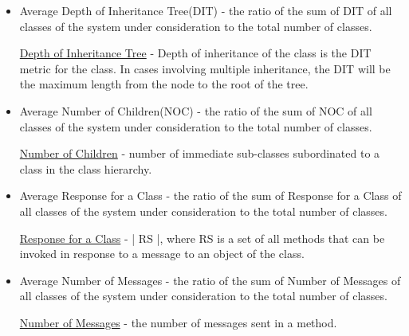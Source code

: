 \documentclass{article}
\begin{document}
\begin{itemize}
\item Average Depth of Inheritance Tree(DIT) - the ratio of the sum of DIT of all classes of the system under consideration to the total number of classes.

\href{https://www.eso.org/~tcsmgr/oowg-forum/TechMeetings/Articles/OOMetrics.pdf}{Depth of Inheritance Tree} - Depth of inheritance of the class is the DIT metric for the class. In cases involving multiple inheritance, the
DIT will be the maximum length from the node to the root of the tree.

\item
Average Number of Children(NOC) - the ratio of the sum of NOC of all classes of the system under consideration to the total number of classes.

\href{https://www.eso.org/~tcsmgr/oowg-forum/TechMeetings/Articles/OOMetrics.pdf}{Number of Children} - number of immediate sub-classes subordinated to a class in the class hierarchy.

\item
Average Response for a Class - the ratio of the sum of Response for a Class of all classes of the system under consideration to the total number of classes.

\href{https://www.eso.org/~tcsmgr/oowg-forum/TechMeetings/Articles/OOMetrics.pdf}{Response for a Class} - \big | RS \big |, where RS is a set of all methods that can be invoked in response to a message to an object of
the class.

\item
Average Number of Messages - the ratio of the sum of Number of Messages of all classes of the system under consideration to the total number of classes.

\href{http://www.cc.uah.es/drg/b/RodHarRama00.English.pdf}{Number of Messages} - the number of messages sent in a method.
\end{itemize}
\end{document}
